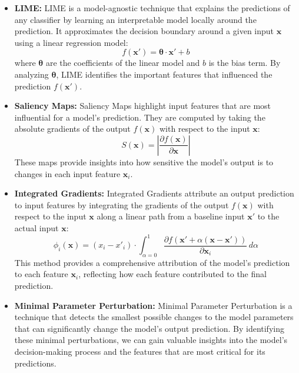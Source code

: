 \documentclass[journal, a4paper]{IEEEtran}
\begin{document}
\begin{itemize}
    \item \textbf{LIME:} LIME is a model-agnostic technique that explains the predictions of any classifier by learning an interpretable model locally around the prediction.
    It approximates the decision boundary around a given input \( \mathbf{x} \) using a linear regression model:
    \[
    f(\mathbf{x}') = \boldsymbol{\theta} \cdot \mathbf{x}' + b
    \]
    where \( \boldsymbol{\theta} \) are the coefficients of the linear model and \( b \) is the bias term.
    By analyzing \( \boldsymbol{\theta} \), LIME identifies the important features that influenced the prediction \( f(\mathbf{x}') \).

    \item \textbf{Saliency Maps:}
    Saliency Maps highlight input features that are most influential for a model's prediction.
    They are computed by taking the absolute gradients of the output \( f(\mathbf{x}) \) with respect to the input \( \mathbf{x} \):
    \[
    S(\mathbf{x}) = \left|\frac{\partial f(\mathbf{x})}{\partial \mathbf{x}}\right|
    \]
    These maps provide insights into how sensitive the model's output is to changes in each input feature \( \mathbf{x}_i \).

    \item \textbf{Integrated Gradients:}
    Integrated Gradients attribute an output prediction to input features by integrating the gradients of the output \( f(\mathbf{x}) \) with respect to the input \( \mathbf{x} \) along a linear path from a baseline input \( \mathbf{x}' \) to the actual input \( \mathbf{x} \):
    \[
    \phi_i(\mathbf{x}) = (x_i - x'_i) \cdot \int_{\alpha=0}^{1} \frac{\partial f(\mathbf{x}' + \alpha (\mathbf{x} - \mathbf{x}'))}{\partial \mathbf{x}_i} \, d\alpha
    \]
    This method provides a comprehensive attribution of the model's prediction to each feature \( \mathbf{x}_i \), reflecting how each feature contributed to the final prediction.

    \item \textbf{Minimal Parameter Perturbation:}
    Minimal Parameter Perturbation is a technique that detects the smallest possible changes to the model parameters that can significantly change the model's output prediction.
    By identifying these minimal perturbations, we can gain valuable insights into the model's decision-making process and the features that are most critical for its predictions.
\end{itemize}
\end{document}
